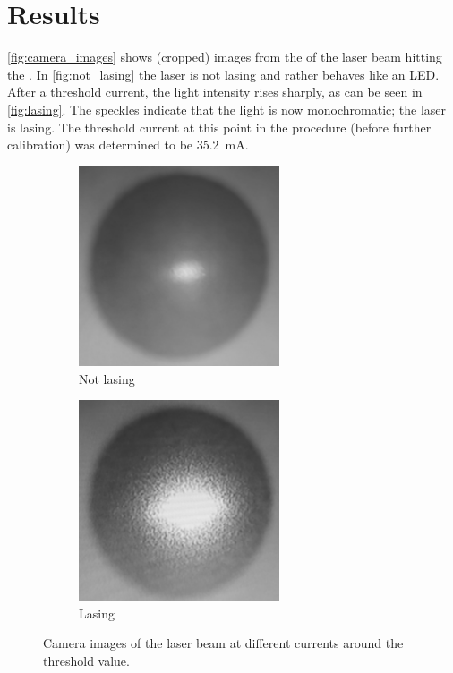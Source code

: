 \section{Results}
\label{sec:auswertung}

\autoref{fig:camera_images} shows (cropped) images
from the 
of the laser beam hitting the .
In \autoref{fig:not_lasing} the laser is not lasing
and rather behaves like an LED.
After a threshold current,
the light intensity rises sharply,
as can be seen in \autoref{fig:lasing}.
The speckles indicate that the light is now monochromatic;
the laser is lasing.
%
The threshold current
    at this point in the procedure (before further calibration)
was determined to be \SI{35.2}{\milli\ampere}.

\begin{figure}
    \centering
    \begin{subfigure}{0.4\textwidth}
        \centering
        \includegraphics[width=0.65\textwidth]{content/img/not_lasing.jpg}
        \caption{Not lasing}
        \label{fig:not_lasing}
    \end{subfigure}
    \begin{subfigure}{0.4\textwidth}
        \centering
        \includegraphics[width=0.65\textwidth]{content/img/lasing.jpg}
        \caption{Lasing}
        \label{fig:lasing}
    \end{subfigure}
    \caption{Camera images of the laser beam at different currents around the threshold value.}
    \label{fig:camera_images}
\end{figure}



